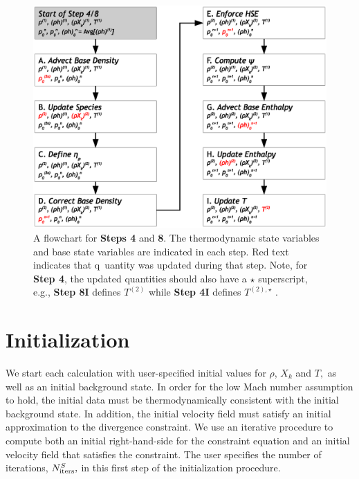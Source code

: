 \begin{figure}[tb]                                                              
\centering
\includegraphics[scale=0.6]{flowchart_4_8}
\caption{\label{Fig:flowchart48}
A flowchart for {\bf Steps 4} and {\bf 8}.  The thermodynamic state variables
and base state variables are indicated in each step.  Red text indicates that q\
uantity
was updated during that step.  Note, for {\bf Step 4}, the updated
quantities should also have a $\star$ superscript, e.g., {\bf Step 8I} defines
$T^{(2)}$ while {\bf Step 4I} defines $T^{(2),\star}$ .}
\end{figure}



\section{Initialization}\label{Sec:Initialization}

We start each calculation with user-specified initial values for
$\rho$, $X_k$ and $T,$ as well as an initial background state.  In
order for the low Mach number assumption to hold, the initial data
must be thermodynamically consistent with the initial background
state.  In addition, the initial velocity field must satisfy an
initial approximation to the divergence constraint.  We use an iterative
procedure to compute both an initial right-hand-side for the
constraint equation and an initial velocity field that satisfies
the constraint.  The user specifies the number of iterations,
$N_{\rm iters}^{S},$ in this first step of the initialization procedure.

